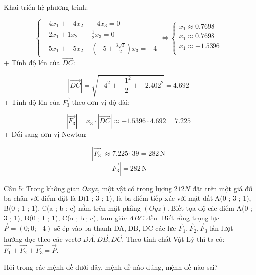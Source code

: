 \documentclass[a4paper,12pt]{article}
\begin{document}
Khai triển hệ phương trình:


\[
\begin{cases}
-4x_1 + -4x_2 + -4x_3 = 0 \\
-2x_1 + 1x_2 + - \frac{1}{2}x_3 = 0 \\
-5x_1 + -5x_2 + \left(-5 + \frac{3 \sqrt{3}}{2}\right)x_3 = -4
\end{cases}
\Leftrightarrow
\begin{cases}
x_1 \approx 0.7698 \\
x_1 \approx 0.7698 \\
x_1 \approx -1.5396 \\
\end{cases}
\]
+ Tính độ lớn của \(\overrightarrow{DC}\):


\[ |\overrightarrow{DC}| = \sqrt{-4^2 + - \frac{1}{2}^2 + -2.402^2} = 4.692 \]
+ Tính độ lớn của \(\overrightarrow{F_3}\) theo đơn vị độ dài:


\[ |\overrightarrow{F_3}| = x_3 \cdot |\overrightarrow{DC}| \approx -1.5396 \cdot 4.692 = 7.225 \]
+ Đổi sang đơn vị Newton:


\[ |\overrightarrow{F_3}| \approx 7.225 \cdot 39 = 282\,\mathrm{N} \]
\[|\overrightarrow{F_3}| = 282\,\mathrm{N}\]



Câu 5: Trong không gian \(Oxyz\), một vật có trọng lượng \(212N\) đặt trên một giá đỡ ba chân với điểm đặt là D(1 ; 3 ; 1), là ba điểm tiếp xúc với mặt đất A(0 ; 3 ; 1), B(0 ; 1 ; 1), C(a ; b ; c) nằm trên mặt phẳng \((O y z )\). Biết tọa độ các điểm A(0 ; 3 ; 1), B(0 ; 1 ; 1), C(a ; b ; c), tam giác \(ABC\) đều. Biết rằng trọng lực \(\overrightarrow{P}=(0 ; 0 ; -4)\) sẽ ép vào ba thanh DA, DB, DC các lực \(\overrightarrow{F}_1, \overrightarrow{F}_2, \overrightarrow{F}_3\) lần lượt hướng dọc theo các vectơ \(\overrightarrow{DA}, \overrightarrow{DB}, \overrightarrow{DC}\). Theo tính chất Vật Lý thì ta có: \(\overrightarrow{F_1}+\overrightarrow{F_2}+\overrightarrow{F_3}=\overrightarrow{P}\).

Hỏi trong các mệnh đề dưới đây, mệnh đề nào đúng, mệnh đề nào sai?
\end{document}
